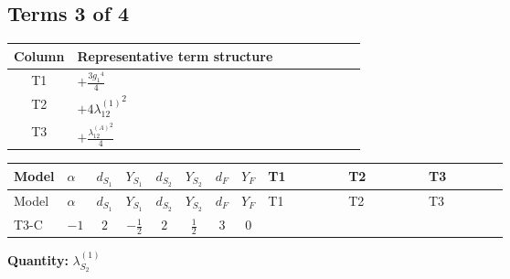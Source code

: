 \documentclass[8pt]{article}
\begin{document}
\begin{landscape}
\subsection*{Terms 3 of 4}
\begin{center}
\begin{tabular}{@{}c >{\raggedright\arraybackslash}p{0.82\linewidth}@{}}
\toprule
Column & Representative term structure \\
\midrule
T1 & \(\displaystyle +\frac{3 {g_1}^4}{4}\) \\
\midrule
T2 & \(\displaystyle +4 {\lambda_{12}^{(1)}}^2\) \\
\midrule
T3 & \(\displaystyle +\frac{{\lambda_{12}^{(A)}}^2}{4}\) \\
\midrule
\bottomrule
\end{tabular}
\end{center}
\smallskip
\tiny
\begin{longtable}{@{}llcccccc >{\raggedright\arraybackslash}p{0.21\linewidth} >{\raggedright\arraybackslash}p{0.21\linewidth} >{\raggedright\arraybackslash}p{0.21\linewidth}@{}}
\toprule
Model & $\alpha$ & $d_{S_1}$ & $Y_{S_1}$ & $d_{S_2}$ & $Y_{S_2}$ & $d_F$ & $Y_F$ & T1 & T2 & T3 \\
\midrule
\endfirsthead
\toprule
Model & $\alpha$ & $d_{S_1}$ & $Y_{S_1}$ & $d_{S_2}$ & $Y_{S_2}$ & $d_F$ & $Y_F$ & T1 & T2 & T3 \\
\midrule
\endhead
T3-C & $-1$ & $2$ & $-\frac{1}{2}$ & $2$ & $\frac{1}{2}$ & $3$ & $0$ & \scriptsize\adjustbox{max width=\linewidth}{$\begin{gathered} +\frac{3 {g_1}^4}{4}\end{gathered}$} & \scriptsize\adjustbox{max width=\linewidth}{$\begin{gathered} +4 {\lambda_{12}^{(1)}}^2\end{gathered}$} & \scriptsize\adjustbox{max width=\linewidth}{$\begin{gathered} +\frac{{\lambda_{12}^{(A)}}^2}{4}\end{gathered}$} \\
\midrule
\bottomrule
\end{longtable}
\clearpage
\noindent\textbf{Quantity: }$\lambda_{S_2}^{(1)}$\par\smallskip

\end{landscape}
\end{document}
